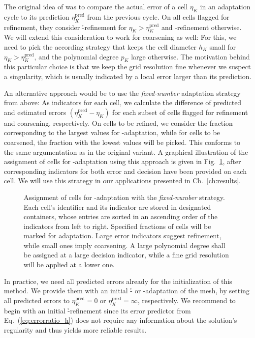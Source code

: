 The original idea of \textcite{melenk2001} was to compare the actual error of a cell $\eta_K$ in an adaptation cycle to its prediction $\eta_K^\text{pred}$ from the previous cycle. On all cells flagged for refinement, they consider \h-refinement for $\eta_K > \eta_K^\text{pred}$ and \p-refinement otherwise. We will extend this consideration to work for coarsening as well: For this, we need to pick the according strategy that keeps the cell diameter $h_K$ small for $\eta_K > \eta_K^\text{pred}$, and the polynomial degree $p_K$ large otherwise. The motivation behind this particular choice is that we keep the grid resolution fine whenever we suspect a singularity, which is usually indicated by a local error larger than its prediction.

An alternative approach would be to use the \textit{fixed-number} adaptation strategy from above: As indicators for each cell, we calculate the difference of predicted and estimated errors $(\eta_K^\text{pred} - \eta_K)$ for each subset of cells flagged for refinement and coarsening, respectively. On cells to be refined, we consider the fraction corresponding to the largest values for \p-adaptation, while for cells to be coarsened, the fraction with the lowest values will be picked. This conforms to the same argumentation as in the original variant. A graphical illustration of the assignment of cells for \hp-adaptation using this approach is given in Fig.~\ref{fig:indicators}, after corresponding indicators for both error and decision have been provided on each cell. We will use this strategy in our applications presented in Ch.~\ref{ch:results}.

\begin{figure}
\centering

\caption[Assignment of cells for \hp-adaptation with the \textit{fixed-number} strategy.]{Assignment of cells for \hp-adaptation with the \textit{fixed-number} strategy. Each cell's identifier and its indicator are stored in designated containers, whose entries are sorted in an ascending order of the indicators from left to right. Specified fractions of cells will be marked for adaptation. Large error indicators suggest refinement, while small ones imply coarsening. A large polynomial degree shall be assigned at a large decision indicator, while a fine grid resolution will be applied at a lower one.}
\label{fig:indicators}
\end{figure}

In practice, we need all predicted errors already for the initialization of this method. We provide them with an initial \h- or \p-adaptation of the mesh, by setting all predicted errors to $\eta_K^\text{pred} = 0$ or $\eta_K^\text{pred} = \infty$, respectively. We recommend to begin with an initial \h-refinement since its error predictor from Eq.~(\ref{eq:errorratio_h}) does not require any information about the solution's regularity and thus yields more reliable results.

